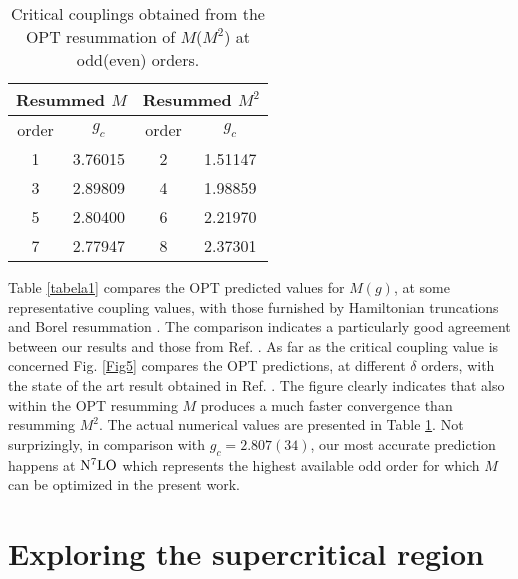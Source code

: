 \documentclass[a4paper,11pt]{article}
\begin{document}
    
    
    

\begin{table}[ht!]
    \centering
    \begin{tabular}{ |c|c||c|c| }
        \hline
        \multicolumn{2}{|c||}{Resummed $M$}&
        \multicolumn{2}{|c|}{Resummed $M^2$} \\
        \hline
        \hline
        order & $g_c$ & order & $g_c$\\
        \hline
        1 & 3.76015 & 2 & 1.51147  \\ 
        3 & 2.89809 & 4 & 1.98859  \\
        5 & 2.80400 & 6 & 2.21970  \\
        7 & 2.77947 & 8 & 2.37301 \\
        \hline
    \end{tabular}
    \caption{Critical couplings obtained from the OPT resummation of $M$($M^2$) at odd(even) orders.}
\label{tabela2}    
\end{table}
 
Table \ref{tabela1} compares the OPT predicted values for $M(g)$, at some representative coupling values,  with those furnished by Hamiltonian truncations   \cite {hamilton6,hamilton7} and Borel resummation  \cite{serone1}. The comparison indicates a  particularly good agreement between our results and those from Ref. \cite{serone1}.
As far as the critical coupling value is concerned  Fig. \ref {Fig5} compares the OPT predictions, at different $\delta$ orders, with the state of the art result obtained in Ref. \cite {serone1}. The figure clearly indicates that also within the OPT  resumming $M$ produces a much faster  convergence than  resumming $M^2$. The actual numerical values are presented in Table \ref{tabela2}. Not surprizingly, in comparison with $g_c = 2.807(34)$,  our most accurate  prediction happens at ${\rm N}^7{\rm LO}$ which represents the highest available odd order for which  $M$ can be optimized in the present work.  






\section{Exploring the supercritical  region}
\end{document}
